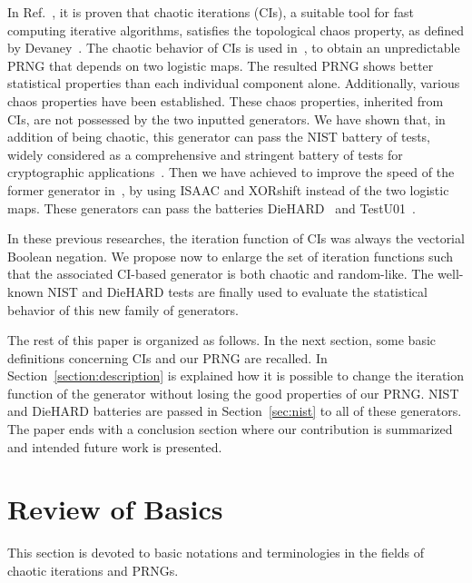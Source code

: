\documentclass[conference]{IEEEtran}
\begin{document}
In Ref.~\cite{guyeux09}, it is proven  that chaotic  iterations (CIs),  a suitable
tool for fast computing  iterative algorithms, satisfies the topological chaos
property, as defined by Devaney~\cite{devaney}.  The chaotic behavior of CIs
is used in~\cite{bgw09:ip}, to obtain an unpredictable PRNG that
depends on two  logistic maps.   The resulted  PRNG shows
better   statistical   properties   than   each  individual   component   alone.
Additionally, various chaos properties  have been established. These chaos properties, inherited from CIs, are not
possessed by  the two inputted generators.   We have shown that,  in addition of
being  chaotic,  this generator  can  pass the  NIST  battery  of tests,  widely
considered as a  comprehensive and stringent battery of  tests for cryptographic
applications~\cite{nist}.
Then we have achieved  to improve the speed of the former generator in~\cite{bgw10:ip,guyeuxTaiwan10}, by using ISAAC and XORshift instead of the two logistic maps.
These generators can pass the batteries DieHARD~\cite{diehard} and TestU01~\cite{testU01}.

In these previous researches, the iteration function of CIs was always the vectorial Boolean negation.
We propose now to enlarge the set of iteration functions such that the associated CI-based generator is both chaotic and random-like.
The well-known NIST and DieHARD tests are finally used to evaluate the statistical behavior of this new family of generators.



The rest of this paper is organized as follows. In the next
section, some basic definitions concerning CIs and our PRNG are recalled.
In Section~\ref{section:description} is explained how it is possible to change the iteration function of the generator without losing the good properties of our PRNG.
NIST and DieHARD batteries are passed in Section~\ref{sec:nist} to all of these generators.
 The
paper ends with a conclusion section where our contribution is summarized and intended future work is presented.







\section{Review of Basics}
\label{Basic recalls}

This section is devoted to basic notations and terminologies in the fields of chaotic iterations and PRNGs.
\end{document}
